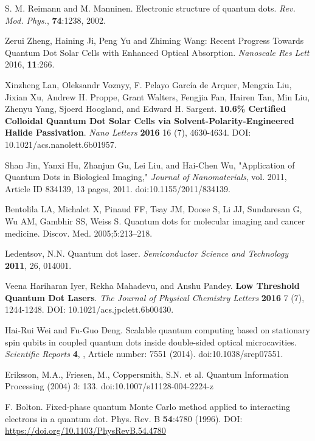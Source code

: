 \documentclass[../main.tex]{subfiles}
\begin{document}
\begin{thebibliography}{99}

 S. M. Reimann and M. Manninen. Electronic structure of quantum dots. \emph{Rev. Mod.
Phys.}, \textbf{74}:1238, 2002.

 Zerui Zheng, Haining Ji, Peng Yu and Zhiming Wang: Recent Progress Towards Quantum Dot Solar Cells with Enhanced Optical Absorption. \emph{Nanoscale Res Lett} 2016, \textbf{11}:266.

 Xinzheng Lan, Oleksandr Voznyy, F. Pelayo García de Arquer, Mengxia Liu, Jixian Xu, Andrew H. Proppe, Grant Walters, Fengjia Fan, Hairen Tan, Min Liu, Zhenyu Yang, Sjoerd Hoogland, and Edward H. Sargent. \textbf{10.6\% Certified Colloidal Quantum Dot Solar Cells via Solvent-Polarity-Engineered Halide Passivation}. \emph{Nano Letters} \textbf{2016} 16 (7), 4630-4634. DOI: 10.1021/acs.nanolett.6b01957.

 Shan Jin, Yanxi Hu, Zhanjun Gu, Lei Liu, and Hai-Chen Wu, "Application of Quantum Dots in Biological Imaging," \emph{Journal of Nanomaterials}, vol. 2011, Article ID 834139, 13 pages, 2011. doi:10.1155/2011/834139.

 Bentolila LA, Michalet X, Pinaud FF, Tsay JM, Doose S, Li JJ, Sundaresan G, Wu AM, Gambhir SS, Weiss S. Quantum dots for molecular imaging and cancer medicine. Discov. Med. 2005;5:213–218.

 Ledentsov, N.N. Quantum dot laser. \emph{Semiconductor Science and Technology} \textbf{2011}, 26, 014001.

 Veena Hariharan Iyer, Rekha Mahadevu, and Anshu Pandey. \textbf{Low Threshold Quantum Dot Lasers}. \emph{The Journal of Physical Chemistry Letters} \textbf{2016} 7 (7), 1244-1248. DOI: 10.1021/acs.jpclett.6b00430.

 Hai-Rui Wei and Fu-Guo Deng. Scalable quantum computing based on stationary spin qubits in coupled quantum dots inside double-sided optical microcavities. \emph{Scientific Reports} \textbf{4}, , Article number: 7551 (2014). doi:10.1038/srep07551.

 Eriksson, M.A., Friesen, M., Coppersmith, S.N. et al. Quantum Information Processing (2004) 3: 133. doi:10.1007/s11128-004-2224-z

 F. Bolton. Fixed-phase quantum Monte Carlo method applied to interacting electrons in
a quantum dot. Phys. Rev. B \textbf{54}:4780 (1996). DOI: \url{https://doi.org/10.1103/PhysRevB.54.4780}


\end{thebibliography}
\end{document}
